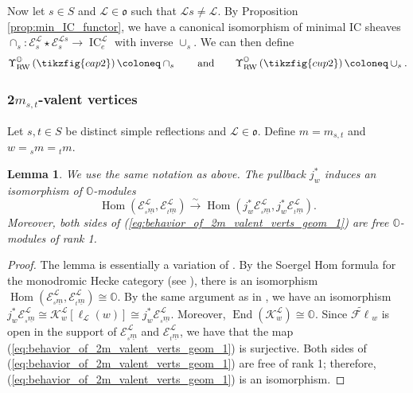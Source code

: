 \documentclass{amsart}
\renewcommand{\O}{\mathbb{O}}
\newcommand{\scrE}{\mathcal{E}}
\newcommand{\scrK}{\mathcal{K}}
\newcommand{\scrL}{\mathcal{L}}
\DeclareMathOperator{\Hom}{Hom}
\DeclareMathOperator{\End}{End}
\DeclareMathOperator{\IC}{IC}
\newcommand{\fr}[1]{\mathfrak{#1}}
\DeclareMathOperator{\RW}{RW}
\newcommand{\eFl}{\widetilde{\mathcal{F}\ell}}
\newtheorem{lemma}[subsubsection]{Lemma}
\theoremstyle{definition}
\numberwithin{equation}{subsection}
\begin{document}
Now let $s \in S$ and $\scrL \in \fr{o}$ such that $\scrL s \neq \scrL$. By Proposition \ref{prop:min_IC_functor}, we have a canonical isomorphism of minimal IC sheaves $\cap_s : \scrE_s^{\scrL} \star \scrE_s^{\scrL s} \to \IC_e^{\scrL}$ with inverse $\cup_s$.
We can then define  
\[\Upsilon_{\RW}^{\O} \left(\tikzfig{cap2} \right) \coloneq \cap_s \qquad\text{and}\qquad \Upsilon_{\RW}^{\O} \left(\tikzfig{cup2} \right) \coloneq \cup_s.\]

\subsubsection{2\texorpdfstring{$m_{s,t}$}{mst}-valent vertices}

Let $s, t \in S$ be distinct simple reflections and $\scrL \in \fr{o}$. Define $m = m_{s,t}$ and $w = {}_s m = {}_t m$. 

\begin{lemma}\label{lem:behavior_of_2m_valent_verts_geom}
    We use the same notation as above. The pullback $j_w^*$ induces an isomorphism of $\O$-modules
    \begin{equation}\label{eq:behavior_of_2m_valent_verts_geom_1}
        \Hom (\scrE_{{}_s \underline{m}}^{\scrL}, \scrE_{{}_t \underline{m}}^{\scrL}) \stackrel{\sim}{\to} \Hom (j_w^* \scrE_{{}_s \underline{m}}^{\scrL}, j_w^* \scrE_{{}_t \underline{m}}^{\scrL}).
    \end{equation}
    Moreover, both sides of (\ref{eq:behavior_of_2m_valent_verts_geom_1}) are free $\O$-modules of rank 1.
\end{lemma}
\begin{proof}
    The lemma is essentially a variation of \cite[Lemma 5.4.4]{Sandvik}. By the Soergel Hom formula for the monodromic Hecke category (see \cite[Proposition 3.8.13]{Sandvik}), there is an isomorphism $\Hom (\scrE_{{}_s \underline{m}}^{\scrL}, \scrE_{{}_t \underline{m}}^{\scrL}) \cong \O$.
    By the same argument as in \cite[Theorem 3.4.1]{Sandvik}, we have an isomorphism $j_w^* \scrE_{{}_s \underline{m}}^{\scrL} \cong \scrK_w^{\scrL} [\ell_{\scrL} (w)] \cong j_w^* \scrE_{{}_s \underline{m}}^{\scrL}$. Moreover, $\End (\scrK_w^{\scrL}) \cong \O$.
    Since $\eFl_w$ is open in the support of $\scrE_{{}_s \underline{m}}^{\scrL}$ and $\scrE_{{}_t \underline{m}}^{\scrL}$, we have that the map (\ref{eq:behavior_of_2m_valent_verts_geom_1}) is surjective.
    Both sides of (\ref{eq:behavior_of_2m_valent_verts_geom_1}) are free of rank 1; therefore, (\ref{eq:behavior_of_2m_valent_verts_geom_1}) is an isomorphism.
\end{proof}
\end{document}
